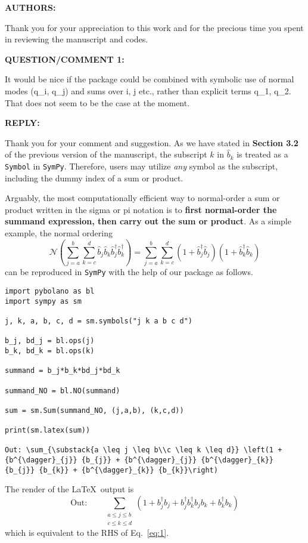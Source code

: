 \documentclass[12pt, a4paper]{article}
\newcommand{\inlinecode}[1]{\texttt{#1}}
\newcommand{\bop}{\hat{b}}
\newcommand{\bdag}{\bop^\dagger}
\newenvironment{revthanks}{%
\color{Black}
\textbf{AUTHORS:}
\par 
Thank you for your appreciation to this work and for the precious time you spent in reviewing the manuscript and codes. 
}
{}
\newenvironment{revq}[1]{%
\phantomsection
\color{RoyalPurple}
\par
\textbf{QUESTION/COMMENT {#1}:}
\par %
}
{\bigskip}
\newenvironment{reva}{%
\color{Black}
\par
\textbf{REPLY:}
\par
}
{\bigskip}
\begin{document}
\begin{revthanks}
\end{revthanks}


\begin{revq}{1}
It would be nice if the package could be combined with symbolic use of normal modes (q\_i, q\_j) and sums over i, j etc., rather than explicit terms q\_1, q\_2. That does not seem to be the case at the moment. 
\end{revq}

\begin{reva}
Thank you for your comment and suggestion. As we have stated in \textbf{Section 3.2} of the previous version of the manuscript, the subscript $k$ in $\hat{b}_k$ is treated as a \inlinecode{Symbol} in \texttt{SymPy}. Therefore, users may utilize \textit{any} symbol as the subscript, including the dummy index of a sum or product. 

Arguably, the most computationally efficient way to normal-order a sum or product written in the sigma or pi notation is to \textbf{first normal-order the summand expression, then carry out the sum or product}. As a simple example, the normal ordering
\begin{equation}\label{eq:1}
    \mathcal{N}\left(\sum_{j=a}^b\sum_{k=c}^d \bop_j\bop_k\bdag_j\bdag_k\right) = \sum_{j=a}^b\sum_{k=c}^d \left(1+\bdag_j\bop_j\right)\left(1+\bdag_k\bop_k\right)
\end{equation}
can be reproduced in \texttt{SymPy} with the help of our package as follows.
\begin{verbatim}
import pybolano as bl
import sympy as sm

j, k, a, b, c, d = sm.symbols("j k a b c d")

b_j, bd_j = bl.ops(j)
b_k, bd_k = bl.ops(k)

summand = b_j*b_k*bd_j*bd_k

summand_NO = bl.NO(summand)

sum = sm.Sum(summand_NO, (j,a,b), (k,c,d))

print(sm.latex(sum))

Out: \sum_{\substack{a \leq j \leq b\\c \leq k \leq d}} \left(1 + {b^{\dagger}_{j}} {b_{j}} + {b^{\dagger}_{j}} {b^{\dagger}_{k}} {b_{j}} {b_{k}} + {b^{\dagger}_{k}} {b_{k}}\right)
\end{verbatim}
The render of the \LaTeX~output is
\begin{equation}
    \text{Out:}\qquad \sum_{\substack{a \leq j \leq b\\c \leq k \leq d}} \left(1 + {b^{\dagger}_{j}} {b_{j}} + {b^{\dagger}_{j}} {b^{\dagger}_{k}} {b_{j}} {b_{k}} + {b^{\dagger}_{k}} {b_{k}}\right)
\end{equation}
which is equivalent to the RHS of Eq.~\eqref{eq:1}.


\end{reva}
\end{document}
